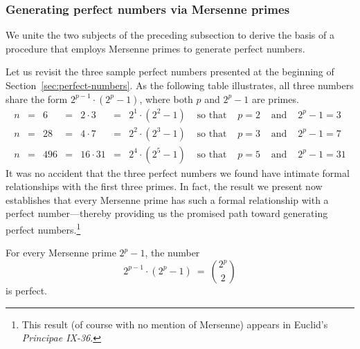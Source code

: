 \subsubsection{Generating perfect numbers via Mersenne primes}
\label{sec:MP+PN}

We unite the two subjects of the preceding subsection to derive the
basis of a procedure that employs Mersenne primes to generate perfect
numbers.

Let us revisit the three sample perfect numbers presented at the
beginning of Section~\ref{sec:perfect-numbers}.  As the following
table illustrates, all three numbers share the form $2^{p-1} \cdot
(2^p -1)$, where both $p$ and $2^p-1$ are primes.
\[ \begin{array}{ccrcrcccccc}
n & = & 6   & = & 2 \cdot 3  & = & 2^1 \cdot (2^2 -1) & 
\mbox{ so that } & p = 2 & 
\mbox{ and } & 2^p-1 = 3 \\
n & = & 28  & = & 4 \cdot 7  & = & 2^2 \cdot (2^3 -1) & 
\mbox{ so that } & p = 3 &
\mbox{ and } & 2^p-1 = 7 \\
n & = & 496 & = & 16 \cdot 31 & = & 2^4 \cdot (2^5 -1) & 
\mbox{ so that } & p=5 &
\mbox{ and } & 2^p-1 = 31
\end{array}
\]
It was no accident that the three perfect numbers we found have
intimate formal relationships with the first three primes.  In fact,
the result we present now establishes that every Mersenne prime has
such a formal relationship with a perfect number---thereby providing
us the promised path toward generating perfect numbers.\footnote{This
  result (of course with no mention of Mersenne) appears in Euclid's
  \textit{Principae IX-36}. }

\begin{prop}
\label{thm:MP-PN}
For every Mersenne prime $2^p-1$, the number
\begin{equation}
\label{eq:Mersenne-perfect-p}
2^{p-1} \cdot (2^p-1) \ = \ {{2^p} \choose 2}
\end{equation} 
is perfect.
\end{prop}

